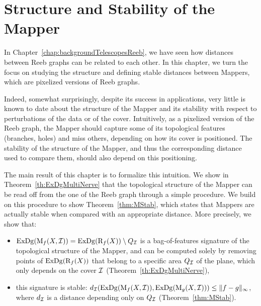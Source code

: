 \chapter{Structure and Stability of the Mapper}
\label{chap:MapperStability}

In Chapter~\ref{chap:backgroundTelescopesReeb}, we have seen how distances between Reeb graphs
can be related to each other. In this chapter, we turn the focus on studying 
the structure and defining stable distances between Mappers, which are pixelized versions of Reeb graphs.

Indeed, somewhat surprisingly, despite its success in applications, very little is
known to date about the structure of the Mapper and its stability with
respect to perturbations of the data or of the cover. Intuitively, 
as a pixelized version of the Reeb graph, the Mapper should capture
some of its topological features (branches, holes) and miss others, 
depending on how its cover is positioned. 
The stability of the structure of the Mapper, and thus the 
corresponding distance used to compare them, should also depend on this positioning.
 

The main result of this chapter is to formalize this intuition. We show in Theorem~\ref{th:ExDgMultiNerve}
that the topological structure of the Mapper can be read off from the one of the Reeb graph through
a simple procedure. We build on this procedure to show Theorem~\ref{thm:MStab}, which states that Mappers are
actually stable when compared with an appropriate distance. 
More precisely, we show that:
\begin{itemize}
\item $\mathrm{ExDg}(\mathrm{M}_f(X,\mathcal{I}))=\mathrm{ExDg}(\mathrm{R}_f(X))\setminus Q_{\mathcal{I}}$ is a bag-of-features signature of the topological structure of the Mapper,
and can be computed solely by removing points of $\mathrm{ExDg}(\mathrm{R}_f(X))$ that belong to a specific area $Q_{\mathcal{I}}$ of the plane, which only depends on the cover $\mathcal{I}$
(Theorem~\ref{th:ExDgMultiNerve}),
\item this signature is stable: $d_{\mathcal{I}}(\mathrm{ExDg}(\mathrm{M}_f(X,\mathcal{I})),\mathrm{ExDg}(\mathrm{M}_g(X,\mathcal{I})))\leq \|f-g\|_\infty$, where $d_{\mathcal{I}}$ is a distance 
depending only on $Q_{\mathcal{I}}$ (Theorem~\ref{thm:MStab}). 
\end{itemize}

